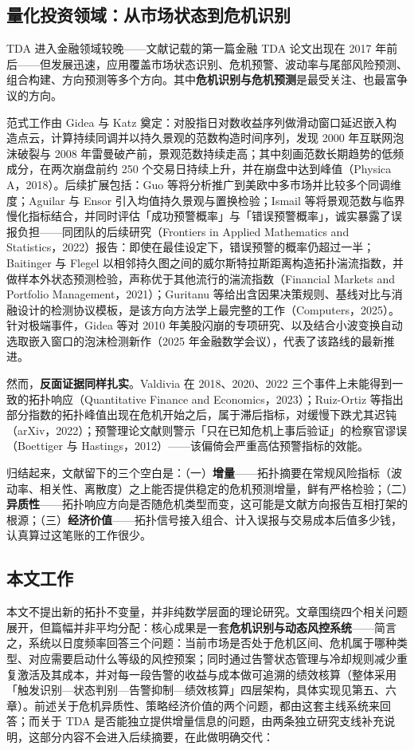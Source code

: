 \documentclass[12pt,a4paper]{ctexart}
\begin{document}
\subsection{量化投资领域：从市场状态到危机识别}
TDA 进入金融领域较晚——文献记载的第一篇金融 TDA 论文出现在 2017 年前后——但发展迅速，应用覆盖市场状态识别、危机预警、波动率与尾部风险预测、组合构建、方向预测等多个方向。其中\textbf{危机识别与危机预测}是最受关注、也最富争议的方向。\par
范式工作由 Gidea 与 Katz 奠定：对股指日对数收益序列做滑动窗口延迟嵌入构造点云，计算持续同调并以持久景观的范数构造时间序列，发现 2000 年互联网泡沫破裂与 2008 年雷曼破产前，景观范数持续走高；其中刻画范数长期趋势的低频成分，在两次崩盘前约 250 个交易日持续上升，并在崩盘中达到峰值（Physica A，2018）。后续扩展包括：Guo 等将分析推广到美欧中多市场并比较多个同调维度；Aguilar 与 Ensor 引入均值持久景观与置换检验；Ismail 等将景观范数与临界慢化指标结合，并同时评估「成功预警概率」与「错误预警概率」，诚实暴露了误报负担——同团队的后续研究（Frontiers in Applied Mathematics and Statistics，2022）报告：即使在最佳设定下，错误预警的概率仍超过一半；Baitinger 与 Flegel 以相邻持久图之间的威尔斯特拉斯距离构造拓扑湍流指数，并做样本外状态预测检验，声称优于其他流行的湍流指数（Financial Markets and Portfolio Management，2021）；Guritanu 等给出含因果决策规则、基线对比与消融设计的检测协议模板，是该方向方法学上最完整的工作（Computers，2025）。针对极端事件，Gidea 等对 2010 年美股闪崩的专项研究、以及结合小波变换自动选取嵌入窗口的泡沫检测新作（2025 年金融数学会议），代表了该路线的最新推进。\par
然而，\textbf{反面证据同样扎实}。Valdivia 在 2018、2020、2022 三个事件上未能得到一致的拓扑响应（Quantitative Finance and Economics，2023）；Ruiz-Ortiz 等指出部分指数的拓扑峰值出现在危机开始之后，属于滞后指标，对缓慢下跌尤其迟钝（arXiv，2022）；预警理论文献则警示「只在已知危机上事后验证」的检察官谬误（Boettiger 与 Hastings，2012）——该偏倚会严重高估预警指标的效能。\par
归结起来，文献留下的三个空白是：（一）\textbf{增量}——拓扑摘要在常规风险指标（波动率、相关性、离散度）之上能否提供稳定的危机预测增量，鲜有严格检验；（二）\textbf{异质性}——拓扑响应方向是否随危机类型而变，这可能是文献方向报告互相打架的根源；（三）\textbf{经济价值}——拓扑信号接入组合、计入误报与交易成本后值多少钱，认真算过这笔账的工作很少。\par
\subsection{本文工作}
本文不提出新的拓扑不变量，并非纯数学层面的理论研究。文章围绕四个相关问题展开，但篇幅并非平均分配：核心成果是一套\textbf{危机识别与动态风控系统}——简言之，系统以日度频率回答三个问题：当前市场是否处于危机区间、危机属于哪种类型、对应需要启动什么等级的风控预案；同时通过告警状态管理与冷却规则减少重复激活及其成本，并对每一段告警的收益与成本做可追溯的绩效核算（整体采用「触发识别—状态判别—告警抑制—绩效核算」四层架构，具体实现见第五、六章）。前述关于危机异质性、策略经济价值的两个问题，都由这套主线系统来回答；而关于 TDA 是否能独立提供增量信息的问题，由两条独立研究支线补充说明，这部分内容不会进入后续摘要，在此做明确交代：
\end{document}
